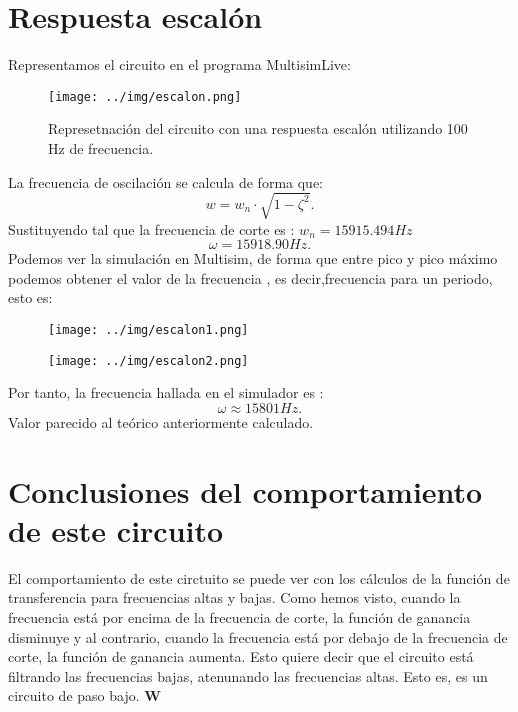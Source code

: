 \documentclass[11pt,letterpaper]{article}
\begin{document}
\section{Respuesta escalón}
Representamos el circuito en el programa MultisimLive:
\begin{figure}[H]
    \centering
    \texttt{[image: ../img/escalon.png]}
    \caption{Represetnación del circuito con una respuesta escalón utilizando 100 Hz de frecuencia.}
    \label{fig:-img-escalon-png}
\end{figure}
La frecuencia de oscilación se calcula de forma que:
\[
w=w_n\cdot \sqrt{1-\zeta^2} 
.\] 
Sustituyendo tal que la frecuencia de corte es : $w_n=15915.494Hz$
\[
\omega= 15918.90 Hz
.\] 
Podemos ver la simulación en Multisim, de forma que entre pico y pico máximo podemos obtener el valor de la frecuencia , es decir,frecuencia para un periodo, esto es:
\begin{figure}[H]
    \centering
    \texttt{[image: ../img/escalon1.png]}
    \label{fig:-img-escalon1-png}
\end{figure}
\begin{figure}[H]
    \centering
    \texttt{[image: ../img/escalon2.png]}
    \label{fig:-img-escalon2-png}
\end{figure}
 Por tanto, la frecuencia hallada en el simulador es :
 \[
 \omega \approx 15801 Hz
 .\] 
 Valor parecido al teórico anteriormente calculado.

 \section{Conclusiones del comportamiento de este circuito}
 El comportamiento de este circtuito se puede ver con los cálculos de la función de transferencia para frecuencias altas y bajas. Como hemos visto, cuando la frecuencia está por encima de la frecuencia de corte, la función de ganancia disminuye y al contrario, cuando la frecuencia está por debajo de la frecuencia de corte, la función de ganancia aumenta. Esto quiere decir que el circuito está filtrando las frecuencias bajas, atenunando las frecuencias altas. Esto es, es un circuito de paso bajo. 
$\mathbf{W} $
 
\end{document}
